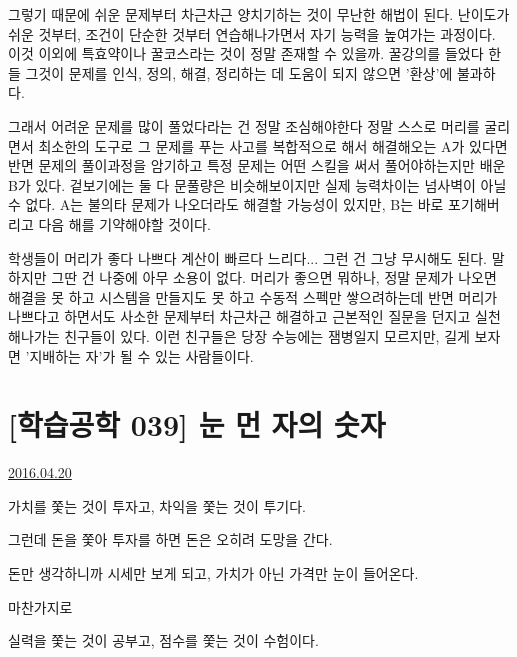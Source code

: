 그렇기 때문에 쉬운 문제부터 차근차근 양치기하는 것이 무난한 해법이 된다.
난이도가 쉬운 것부터, 조건이 단순한 것부터 연습해나가면서 자기 능력을 높여가는 과정이다.
이것 이외에 특효약이나 꿀코스라는 것이 정말 존재할 수 있을까.
꿀강의를 들었다 한들 그것이 문제를 인식, 정의, 해결, 정리하는 데 도움이 되지 않으면 '환상'에 불과하다.
\vspace{5mm}

그래서 어려운 문제를 많이 풀었다라는 건 정말 조심해야한다
정말 스스로 머리를 굴리면서 최소한의 도구로 그 문제를 푸는 사고를 복합적으로 해서 해결해오는 A가 있다면
반면 문제의 풀이과정을 암기하고 특정 문제는 어떤 스킬을 써서 풀어야하는지만 배운 B가 있다.
겉보기에는 둘 다 문풀량은 비슷해보이지만 실제 능력차이는 넘사벽이 아닐 수 없다.
A는 불의타 문제가 나오더라도 해결할 가능성이 있지만, B는 바로 포기해버리고 다음 해를 기약해야할 것이다.
\vspace{5mm}

학생들이 머리가 좋다 나쁘다 계산이 빠르다 느리다... 그런 건 그냥 무시해도 된다.
말하지만 그딴 건 나중에 아무 소용이 없다.
머리가 좋으면 뭐하나, 정말 문제가 나오면 해결을 못 하고 시스템을 만들지도 못 하고 수동적 스펙만 쌓으려하는데
반면 머리가 나쁘다고 하면서도 사소한 문제부터 차근차근 해결하고 근본적인 질문을 던지고 실천해나가는 친구들이 있다.
이런 친구들은 당장 수능에는 잼병일지 모르지만, 길게 보자면 '지배하는 자'가 될 수 있는 사람들이다.
\vspace{5mm}



\section{[학습공학 039] 눈 먼 자의 숫자}
\href{https://www.kockoc.com/Apoc/737509}{2016.04.20}

\vspace{5mm}

가치를 쫓는 것이 투자고, 차익을 쫓는 것이 투기다.
\vspace{5mm}

그런데 돈을 쫓아 투자를 하면 돈은 오히려 도망을 간다.
\vspace{5mm}

돈만 생각하니까 시세만 보게 되고, 가치가 아닌 가격만 눈이 들어온다.
\vspace{5mm}

마찬가지로
\vspace{5mm}

실력을 쫓는 것이 공부고, 점수를 쫓는 것이 수험이다.
\vspace{5mm}

